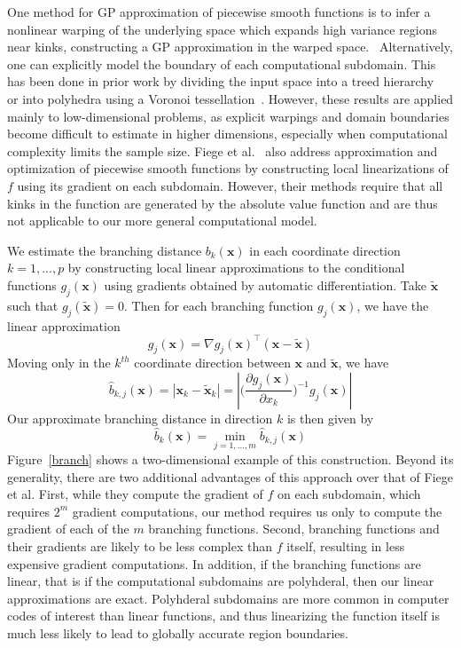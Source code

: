 \documentclass{article}
\newcommand{\abs}[1]{\left|#1\right|}
\renewcommand{\vec}[1]{\mathbf{#1}}
\numberwithin{equation}{section}
\begin{document}
One method for GP approximation of piecewise smooth functions is to infer a nonlinear warping of the underlying space which expands high variance regions near kinks, constructing a GP approximation in the warped space.~\cite{marmin2018warped, xiong2007non} Alternatively, one can explicitly model the boundary of each computational subdomain. This has been done in prior work by dividing the input space into a treed hierarchy~\cite{gramacy2008bayesian} or into polyhedra using a Voronoi tessellation~\cite{kim2005analyzing}. However, these results are applied mainly to low-dimensional problems, as explicit warpings and domain boundaries become difficult to estimate in higher dimensions, especially when computational complexity limits the sample size. Fiege et al.~\cite{fiege2018algorithmic} also address approximation and optimization of piecewise smooth functions by constructing local linearizations of $f$ using its gradient on each subdomain. However, their methods require that all kinks in the function are generated by the absolute value function and are thus not applicable to our more general computational model.

We estimate the branching distance $b_k(\vec{x})$ in each coordinate direction $k=1,...,p$ by constructing local linear approximations to the conditional functions $g_j(\vec{x})$ using gradients obtained by automatic differentiation. Take $\tilde{\vec{x}}$ such that $g_j(\tilde{\vec{x}}) = 0$. Then for each branching function $g_j(\vec{x})$, we have the linear approximation
$$ g_j(\vec{x}) = \nabla g_j(\vec{x})^\top (\vec{x} - \tilde{\vec{x}}) $$
Moving only in the $k^{th}$ coordinate direction between $\vec{x}$ and $\tilde{\vec{x}}$, we have
$$ \hat{b}_{k,j}(\vec{x}) = \abs{\vec{x}_k - \tilde{\vec{x}}_k} = \abs{\bigg(\frac{\partial g_j(\vec{x})}{\partial x_k}\bigg)^{-1} g_j(\vec{x})} $$
Our approximate branching distance in direction $k$ is then given by
$$ \hat{b}_k(\vec{x}) = \min_{j=1,...,m} \hat{b}_{k,j}(\vec{x}) $$
Figure~\ref{branch} shows a two-dimensional example of this construction. Beyond its generality, there are two additional advantages of this approach over that of Fiege et al. First, while they compute the gradient of $f$ on each subdomain, which requires $2^m$ gradient computations, our method requires us only to compute the gradient of each of the $m$ branching functions. Second, branching functions and their gradients are likely to be less complex than $f$ itself, resulting in less expensive gradient computations. In addition, if the branching functions are linear, that is if the computational subdomains are polyhderal, then our linear approximations are exact. Polyhderal subdomains are more common in computer codes of interest than linear functions, and thus linearizing the function itself is much less likely to lead to globally accurate region boundaries.
\end{document}
